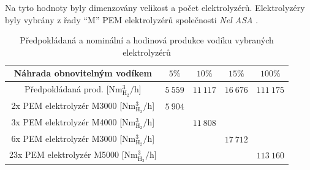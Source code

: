 \noindent
Na tyto hodnoty byly dimenzovány velikost a počet elektrolyzérů. Elektrolyzéry byly vybrány z řady \enquote{M} PEM elektrolyzérů společnosti \textit{Nel ASA} \cite{prakticka_elektrolyzer}.
\begin{table}[h!]
    \centering
    \begin{tabular}{|c|c|c|c|c|}
        \hline
        Náhrada obnovitelným vodíkem & $5\%$ & $10\%$ & $15\%$ & $100\%$\\ \hline
        Předpokládaná prod. [$\mathrm{Nm^3_{H_2}}/$h] & $5\ 559$ & $11\ 117$ & $16\ 676$ & $111\ 175$\\ \hline\hline
        2x PEM elektrolyzér M3000 [$\mathrm{Nm^3_{H_2}}/$h] & $5\ 904$ & & & \\ \hline
        3x PEM elektrolyzér M4000 [$\mathrm{Nm^3_{H_2}}/$h] & & $11\ 808$ & & \\ \hline
        6x PEM elektrolyzér M3000 [$\mathrm{Nm^3_{H_2}}/$h] & & & $17\ 712$ & \\ \hline
        23x PEM elektrolyzér M5000 [$\mathrm{Nm^3_{H_2}}/$h] & & & & $113\ 160$ \\ \hline
    \end{tabular}
    \caption[Předpokládaná a nominální a hodinová produkce vodíku vybraných elektrolyzérů]{Předpokládaná a nominální a hodinová produkce vodíku vybraných elektrolyzérů}
    \label{tab:vybrane_elektrolyzery}
\end{table}

